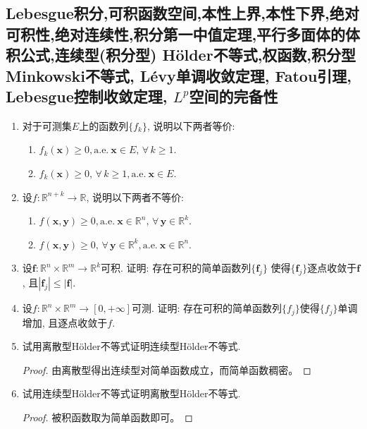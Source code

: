 \subsection{Lebesgue积分,可积函数空间,本性上界,本性下界,绝对可积性,绝对连续性,积分第一中值定理,平行多面体的体积公式,连续型(积分型) H\"{o}lder不等式,权函数,积分型Minkowski不等式, L\'{e}vy单调收敛定理, Fatou引理, Lebesgue控制收敛定理, \(L^p\)空间的完备性}
\begin{quiza}
\begin{enumerate}
\item 对于可测集\(E\)上的函数列\(\{f_k\}\), 说明以下两者等价:
\begin{enumerate}[label=(\roman*)]
\item \(f_k(\boldsymbol{x})\geqslant 0,\mathrm{a.e.}\ \boldsymbol{x}\in E,\,\forall\, k\geqslant 1\).
\item \(f_k(\boldsymbol{x})\geqslant 0,\,\forall\, k\geqslant 1,\mathrm{a.e.}\ \boldsymbol{x}\in E\).
\end{enumerate}

\item 设\(f:\mathbb{R}^{n+k}\rightarrow\mathbb{R}\), 说明以下两者不等价:
\begin{enumerate}[label=(\roman*)]
\item \(f(\boldsymbol{x},\boldsymbol{y})\geqslant 0,\mathrm{a.e.}\ \boldsymbol{x}\in\mathbb{R}^n,\,\forall\,\boldsymbol{y}\in\mathbb{R}^k\).
\item \(f(\boldsymbol{x},\boldsymbol{y})\geqslant 0,\,\forall\,\boldsymbol{y}\in\mathbb{R}^k,\mathrm{a.e.}\ \boldsymbol{x}\in\mathbb{R}^n\).
\end{enumerate}

\item 设\(\boldsymbol{f}:\mathbb{R}^n\times\mathbb{R}^{m}\rightarrow\mathbb{R}^k\)可积. 
证明: 存在可积的简单函数列\(\{{\bm f}_{\!j}\}\)
使得\(\{{\bm f}_{\!j}\}\)逐点收敛于\(\boldsymbol{f}\), 
且\(|{\bm f}_{\!j}|\leqslant|\boldsymbol{f}|\).

\item 设\(f:\mathbb{R}^n\times\mathbb{R}^m\rightarrow [0,+\infty]\)可测. 
证明: 存在可积的简单函数列\(\{f_j\}\)使得\(\{f_j\}\)单调增加, 且逐点收敛于\(f\).

\item 试用离散型H\"{o}lder不等式证明连续型H\"{o}lder不等式.
\begin{proof}
    由离散型得出连续型对简单函数成立，而简单函数稠密。
\end{proof}

\item 试用连续型H\"{o}lder不等式证明离散型H\"{o}lder不等式.
\begin{proof}
    被积函数取为简单函数即可。
\end{proof}


\end{enumerate}
\end{quiza}
